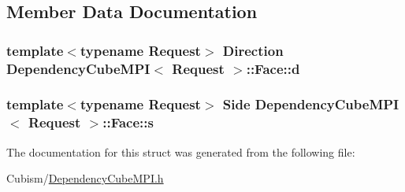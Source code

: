 \subsection{Member Data Documentation}
\hypertarget{struct_dependency_cube_m_p_i_1_1_face_a8ca1f274c00b7e97ab3c327d3236494f}{}
\subsubsection[{d}]{\setlength{\rightskip}{0pt plus 5cm}template$<$typename Request$>$ Direction {\bf Dependency\+Cube\+M\+P\+I}$<$ Request $>$\+::Face\+::d}\label{struct_dependency_cube_m_p_i_1_1_face_a8ca1f274c00b7e97ab3c327d3236494f}
\hypertarget{struct_dependency_cube_m_p_i_1_1_face_a0f93c85a3376303880fc199236b0e3da}{}
\subsubsection[{s}]{\setlength{\rightskip}{0pt plus 5cm}template$<$typename Request$>$ Side {\bf Dependency\+Cube\+M\+P\+I}$<$ Request $>$\+::Face\+::s}\label{struct_dependency_cube_m_p_i_1_1_face_a0f93c85a3376303880fc199236b0e3da}


The documentation for this struct was generated from the following file\+:\begin{DoxyCompactItemize}
\item 
Cubism/\hyperlink{_dependency_cube_m_p_i_8h}{Dependency\+Cube\+M\+P\+I.\+h}\end{DoxyCompactItemize}

